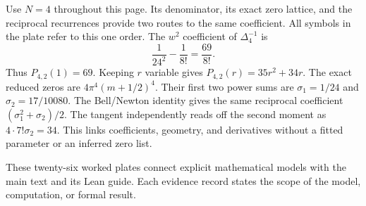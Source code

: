 Use $N=4$ throughout this page. Its denominator, its exact zero lattice, and the reciprocal recurrences provide two routes to the same coefficient. All symbols in the plate refer to this one order.
The $w^2$ coefficient of $\Delta_4^{-1}$ is
\[
\frac1{24^2}-\frac1{8!}=\frac{69}{8!}.
\]
Thus $P_{4,2}(1)=69$. Keeping $r$ variable gives $P_{4,2}(r)=35r^2+34r$.
The exact reduced zeros are $4\pi^4(m+1/2)^4$. Their first two power sums are $\sigma_1=1/24$ and $\sigma_2=17/10080$. The Bell/Newton identity gives the same reciprocal coefficient $(\sigma_1^2+\sigma_2)/2$. The tangent independently reads off the second moment as $4\cdot7!\sigma_2=34$.
This links coefficients, geometry, and derivatives without a fitted parameter or an inferred zero list.

These twenty-six worked plates connect explicit mathematical models with the main text and its Lean guide. Each evidence record states the scope of the model, computation, or formal result.

